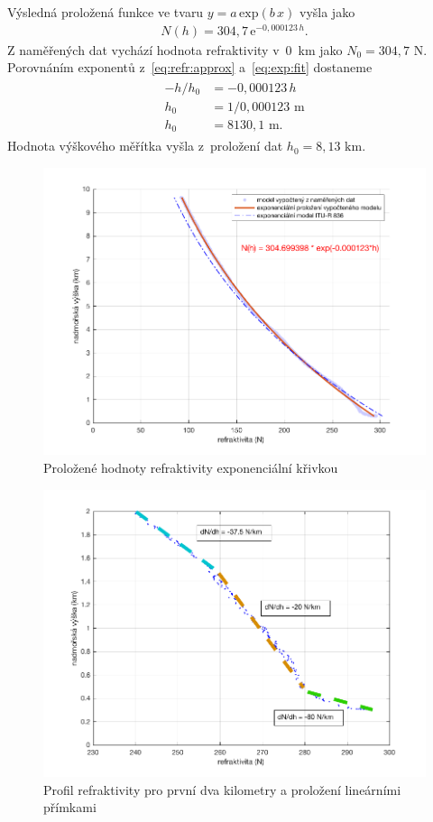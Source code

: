 \documentclass[twoside]{ctuthesis}
\newcommand{\mt}[1]{\text{#1}}
\theoremstyle{plain}
\theoremstyle{definition}
\theoremstyle{note}
\begin{document}
	Výsledná proložená funkce ve tvaru $y=a\,\mt{exp}(b\,x)$ vyšla jako
	\begin{align}
		N(h) = 304{,}7\,\mt{e}^{-0{,}000123\,h}.
		\label{eq:exp:fit}
	\end{align}
	Z naměřených dat vychází hodnota refraktivity v~0~km jako $N_\mt{0} = 304{,}7 \mt{ N}$. Porovnáním exponentů z~\eqref{eq:refr:approx} a~\eqref{eq:exp:fit} dostaneme
	\begin{align}
		\begin{split}
		-h/h_\mt{0} &= -0{,}000123\,h\\
		h_\mt{0} &= 1/0{,}000123 \mt{ m}\\
		h_\mt{0} &= 8130{,}1 \mt{ m}.
		\end{split}
	\end{align}
	Hodnota výškového měřítka vyšla z~proložení dat $h_\mt{0} = 8{,}13 \mt{ km}$.
	\begin{figure}[hbtp]
		\centering
		\includegraphics[width=.8\textwidth]{Graphs/refractivity_meas_fit_model.pdf}
		\caption{Proložené hodnoty refraktivity exponenciální křivkou}
		\label{graph:refr:fit}
	\end{figure}

	\begin{figure}
		\centering
		\includegraphics[width=.8\textwidth]{Graphs/N_gradient.pdf}
		\caption{Profil refraktivity pro první dva kilometry a proložení lineárními přímkami}
		\label{graf:refr:2km}
	\end{figure}
\end{document}
